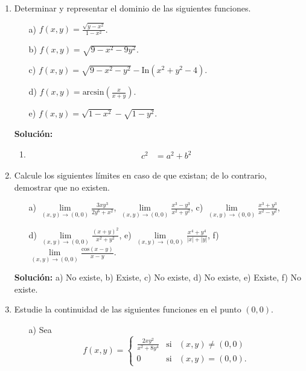 \documentclass[12pt,legalpaper]{report}
\begin{document}
\begin{enumerate}
\item Determinar  y representar el dominio de las siguientes funciones.
\begin{enumerate}
  \item[{\color{blue}a)}] $f(x,y)=\frac{\sqrt{y-x^{2}}}{1-x^{2}}$.
  \item[b)] $f(x,y)=\sqrt{9-x^{2}-9y^{2}}$.
  \item[{\color{blue}c)}] $f(x,y)=\sqrt{9-x^{2}-y^{2}}-
      \text{In}(x^{2}+y^{2}-4)$.
  \item[d)] $f(x,y)= \text{arcsin}\left(\frac{x}{x+y}\right)$.
  \item[{\color{blue}e)}] $f(x,y)=\sqrt{1-x^{2}}-\sqrt{1-y^{2}}$.
\end{enumerate}
\textbf{Solución: }\par
\begin{enumerate}
  \item 
    \begin{align*}
      c^2 &= a^2 + b^2
    \end{align*}
\end{enumerate}

\item Calcule los siguientes límites en caso de que existan; de lo contrario, demostrar que no existen.
\begin{enumerate}
  \item[{\color{blue}a)}] $\lim\limits_{(x,y)\to (0,0)}\frac{3xy^3}{2y^6+x^2}$, \quad {} $\lim\limits_{(x,y)\to (0,0)}\frac{x^3-y^3}{x^2+y^2}$, \quad \quad c) $\lim\limits_{(x,y)\to (0,0)}\frac{x^3+y^3}{x^2-y^2}$,
  \item[{\color{blue}d)}] $\lim\limits_{(x,y)\to (0,0)}\frac{(x+y)^2}{x^2+y^2}$, \quad \quad e) $\lim\limits_{(x,y)\to (0,0)}\frac{x^4+y^4}{|x|+|y|}$, \quad \quad f) $\lim\limits_{(x,y)\to (0,0)}\frac{\text{cos}(x-y)}{x-y}$.
\end{enumerate}

\textbf{Solución:} a) No existe, b) Existe, c) No existe, d) No existe, e) Existe, f) No existe.


\item Estudie la continuidad de las siguientes funciones en el punto $(0,0)$.
\begin{enumerate}
  \item[{\color{blue}a)}] Sea
    \begin{equation*}
      f(x,y)= \left\{ \begin{array}{lcc}
        \frac{2xy^{2}}{x^{2}+8y^{4}} & \text{si} & (x,y) \neq (0,0) \\
        0                            & \text{si} & (x,y)=(0,0).
      \end{array}
      \right.
    \end{equation*}


\end{enumerate}
\end{enumerate}
\end{document}
